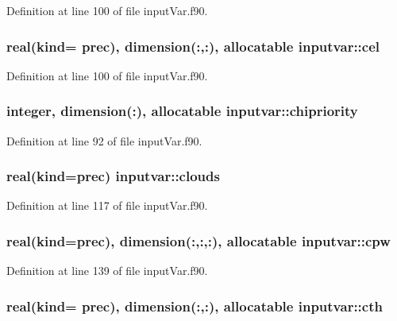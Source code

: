 Definition at line 100 of file input\-Var.\-f90.

\hypertarget{classinputvar_aae07469e8800dce385d02a73306d320c}{
\subsubsection[{cel}]{\setlength{\rightskip}{0pt plus 5cm}real(kind= prec), dimension(\-:,\-:), allocatable inputvar\-::cel}}\label{classinputvar_aae07469e8800dce385d02a73306d320c}


Definition at line 100 of file input\-Var.\-f90.

\hypertarget{classinputvar_a2cb9252c074d0ed99a8ec738dfc04ee2}{
\subsubsection[{chipriority}]{\setlength{\rightskip}{0pt plus 5cm}integer, dimension(\-:), allocatable inputvar\-::chipriority}}\label{classinputvar_a2cb9252c074d0ed99a8ec738dfc04ee2}


Definition at line 92 of file input\-Var.\-f90.

\hypertarget{classinputvar_a20445ed085b01d2d9787297ac8390cd8}{
\subsubsection[{clouds}]{\setlength{\rightskip}{0pt plus 5cm}real(kind=prec) inputvar\-::clouds}}\label{classinputvar_a20445ed085b01d2d9787297ac8390cd8}


Definition at line 117 of file input\-Var.\-f90.

\hypertarget{classinputvar_aa5889e6180140933c4866b2e05765458}{
\subsubsection[{cpw}]{\setlength{\rightskip}{0pt plus 5cm}real(kind=prec), dimension(\-:,\-:,\-:), allocatable inputvar\-::cpw}}\label{classinputvar_aa5889e6180140933c4866b2e05765458}


Definition at line 139 of file input\-Var.\-f90.

\hypertarget{classinputvar_adcb3f28e49daee36d91bc87941f486c9}{
\subsubsection[{cth}]{\setlength{\rightskip}{0pt plus 5cm}real(kind= prec), dimension(\-:,\-:), allocatable inputvar\-::cth}}\label{classinputvar_adcb3f28e49daee36d91bc87941f486c9}


